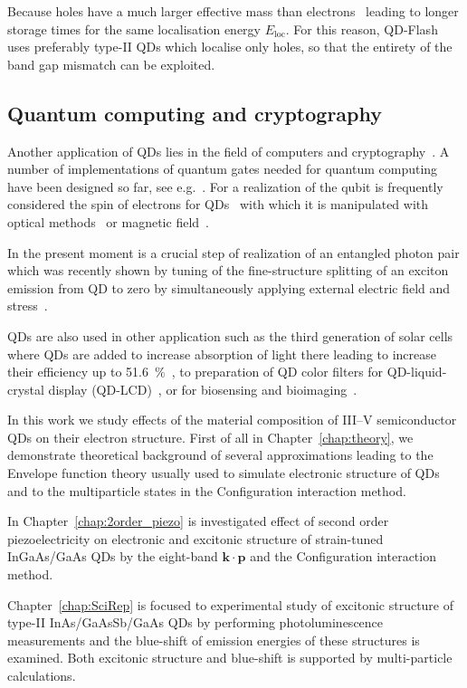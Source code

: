\documentclass[
a4paper, %
11pt, %
onecolumn, %
openany, %
oldfontcommands,
]{memoir}
\begin{document}
Because holes have a much larger effective mass than electrons~\cite{sze} leading to longer storage times for the same localisation energy $E_\mathrm{loc}$. For this reason, QD-Flash uses preferably type-II QDs which localise only holes, so that the entirety of the band gap mismatch can be exploited.

\subsection*{Quantum computing and cryptography}
Another application of QDs lies in the field of computers and cryptography~\cite{Feynman,Deutsch,Loss}. A number of implementations of quantum gates needed for quantum computing have been designed so far, see e.g.~\cite{Bennett}. For a realization of the qubit is frequently considered the spin of electrons for QDs~\cite{Loss} with which it is manipulated with optical methods~\cite{Hafenbrak} or magnetic field~\cite{Burkard}. 

In the present moment is a crucial step of realization of an entangled photon pair which was recently shown by tuning of the fine-structure splitting of an exciton emission from QD to zero by simultaneously applying external electric field and stress~\cite{Trotta}.

\vspace{0.2cm}
QDs are also used in other application such as the third generation of solar cells where QDs are added to increase absorption of light there leading to increase their efficiency up to 51.6~$\%$~\cite{Jiang_NonoEn2015_QDsolarcell}, to preparation of QD color filters for QD-liquid-crystal display (QD-LCD)~\cite{Chen_IEEE_2017_QLED}, or for biosensing and bioimaging~\cite{Li_JMaterChemB_2014_biosensing}.

\vspace{0.2cm}
In this work we study effects of the material composition of III--V semiconductor QDs on their electron structure. First of all in Chapter~\ref{chap:theory}, we demonstrate theoretical background of several approximations leading to the Envelope function theory usually used to simulate electronic structure of QDs and to the multiparticle states in the Configuration interaction method.

In Chapter~\ref{chap:2order_piezo} is investigated effect of second order piezoelectricity on electronic and excitonic structure of strain-tuned InGaAs/GaAs QDs by the eight-band $\mathbf{k \cdot p}$ and the Configuration interaction method.

Chapter~\ref{chap:SciRep} is focused to experimental study of excitonic structure of type-II InAs/GaAsSb/GaAs QDs by performing photoluminescence measurements and the blue-shift of emission energies of these structures is examined. Both excitonic structure and blue-shift is supported by multi-particle calculations.
\end{document}
